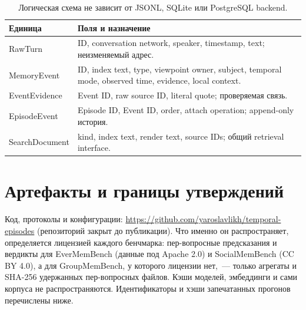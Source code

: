 \documentclass[11pt,a4paper]{article}
\begin{document}
\begin{table}[ht]
\centering\small
\begin{tabularx}{\linewidth}{lX}
\toprule
Единица & Поля и назначение\\
\midrule
RawTurn & ID, conversation network, speaker, timestamp, text; неизменяемый адрес.\\
MemoryEvent & ID, index text, type, viewpoint owner, subject, temporal mode,
observed time, evidence, local context.\\
EventEvidence & Event ID, raw source ID, literal quote; проверяемая связь.\\
EpisodeEvent & Episode ID, Event ID, order, attach operation; append-only история.\\
SearchDocument & kind, index text, render text, source IDs; общий retrieval interface.\\
\bottomrule
\end{tabularx}
\caption{Логическая схема не зависит от JSONL, SQLite или PostgreSQL backend.}
\end{table}

\section{Артефакты и границы утверждений}

Код, протоколы и конфигурации:
\url{https://github.com/yaroslavlikh/temporal-episodes} (репозиторий закрыт до
публикации). Что именно он распространяет, определяется лицензией каждого
бенчмарка: пер-вопросные предсказания и вердикты для EverMemBench (данные под
Apache 2.0) и SocialMemBench (CC BY 4.0), а для GroupMemBench, у которого
лицензии нет,~--- только агрегаты и SHA-256 удержанных пер-вопросных файлов.
Кэши моделей, эмбеддинги и сами корпуса не распространяются. Идентификаторы и
хэши запечатанных прогонов перечислены ниже.
\end{document}
